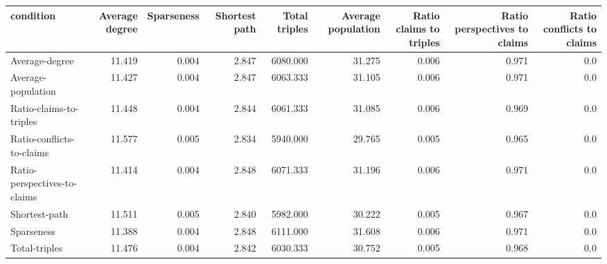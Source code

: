 \begin{tabular}{lrrrrrrrr}
\toprule
                   condition &  Average degree &  Sparseness &  Shortest path &  Total triples &  Average population &  Ratio claims to triples &  Ratio perspectives to claims &  Ratio conflicts to claims \\
\midrule
              Average-degree &          11.419 &       0.004 &          2.847 &       6080.000 &              31.275 &                    0.006 &                         0.971 &                        0.0 \\
          Average-population &          11.427 &       0.004 &          2.847 &       6063.333 &              31.105 &                    0.006 &                         0.971 &                        0.0 \\
     Ratio-claims-to-triples &          11.448 &       0.004 &          2.844 &       6061.333 &              31.085 &                    0.006 &                         0.969 &                        0.0 \\
   Ratio-conflicts-to-claims &          11.577 &       0.005 &          2.834 &       5940.000 &              29.765 &                    0.005 &                         0.965 &                        0.0 \\
Ratio-perspectives-to-claims &          11.414 &       0.004 &          2.848 &       6071.333 &              31.196 &                    0.006 &                         0.971 &                        0.0 \\
               Shortest-path &          11.511 &       0.005 &          2.840 &       5982.000 &              30.222 &                    0.005 &                         0.967 &                        0.0 \\
                  Sparseness &          11.388 &       0.004 &          2.848 &       6111.000 &              31.608 &                    0.006 &                         0.971 &                        0.0 \\
               Total-triples &          11.476 &       0.004 &          2.842 &       6030.333 &              30.752 &                    0.005 &                         0.968 &                        0.0 \\
\bottomrule
\end{tabular}
